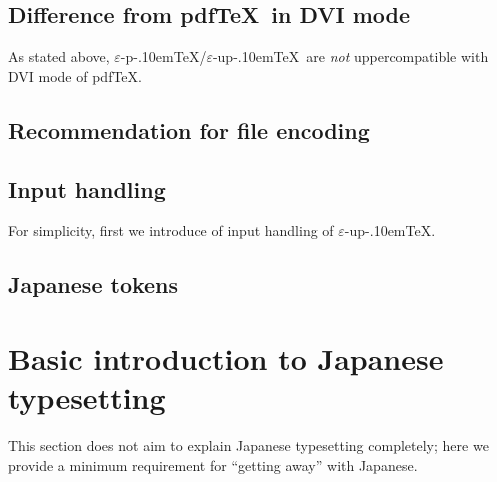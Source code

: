\documentclass[a4paper,11pt]{article}
\def\epTeX{$\varepsilon$-\pTeX}\def\eTeX{$\varepsilon$-\TeX}
\def\eupTeX{$\varepsilon$-\upTeX}\def\upTeX{u\pTeX}
\def\pTeX{p\kern-.10em\TeX}
\def\pdfTeX{pdf\TeX}
\begin{document}


\subsection{Difference from \pdfTeX\ in DVI mode}\label{dvi-pdftex}

As stated above,
\epTeX/\eupTeX\ are {\em not} uppercompatible with DVI mode of \pdfTeX.


\subsection{Recommendation for file encoding}


\subsection{Input handling}

For simplicity, first we introduce of input handling of \eupTeX.


\subsection{Japanese tokens}

\section{Basic introduction to Japanese typesetting}

This section does not aim to explain Japanese typesetting completely;
here we provide a minimum requirement for ``getting away'' with Japanese.

\end{document}

